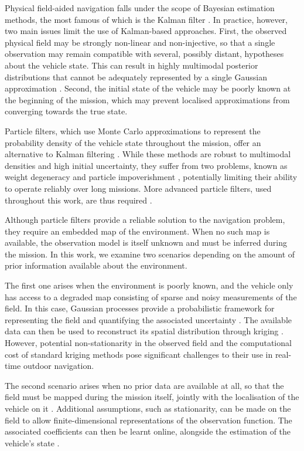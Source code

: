Physical field-aided navigation falls under the scope of Bayesian estimation methods, the most famous of which is the Kalman filter \cite{bib:Kalman}. In practice, however, two main issues limit the use of Kalman-based approaches. First, the observed physical field may be strongly non-linear and non-injective, so that a single observation may remain compatible with several, possibly distant, hypotheses about the vehicle state. This can result in highly multimodal posterior distributions that cannot be adequately represented by a single Gaussian approximation \cite{bib:mixture-RBPF-TAN}. Second, the initial state of the vehicle may be poorly known at the beginning of the mission, which may prevent localised approximations from converging towards the true state.

Particle filters, which use Monte Carlo approximations to represent the probability density of the vehicle state throughout the mission, offer an alternative to Kalman filtering \cite{bib:bootstrap-filter,bib:PF-navigation}. While these methods are robust to multimodal densities and high initial uncertainty, they suffer from two problems, known as weight degeneracy and particle impoverishment \cite{bib:degeneracy}, potentially limiting their ability to operate reliably over long missions. More advanced particle filters, used throughout this work, are thus required \cite{bib:RPF}.

Although particle filters provide a reliable solution to the navigation problem, they require an embedded map of the environment. When no such map is available, the observation model is itself unknown and must be inferred during the mission. In this work, we examine two scenarios depending on the amount of prior information available about the environment.

The first one arises when the environment is poorly known, and the vehicle only has access to a degraded map consisting of sparse and noisy measurements of the field. In this case, Gaussian processes provide a probabilistic framework for representing the field and quantifying the associated uncertainty \cite{bib:Rasmussen-regression}. The available data can then be used to reconstruct its spatial distribution through kriging \cite{bib:Matheron}. However, potential non-stationarity in the observed field \cite{bib:non-stationary-GP} and the computational cost of standard kriging methods \cite{bib:Rasmussen-approximation} pose significant challenges to their use in real-time outdoor navigation.

The second scenario arises when no prior data are available at all, so that the field must be mapped during the mission itself, jointly with the localisation of the vehicle on it \cite{bib:SLAM-tutorial}. Additional assumptions, such as stationarity, can be made on the field to allow finite-dimensional representations of the observation function. The associated coefficients can then be learnt online, alongside the estimation of the vehicle's state \cite{bib:magnetic-SLAM-3D}.

